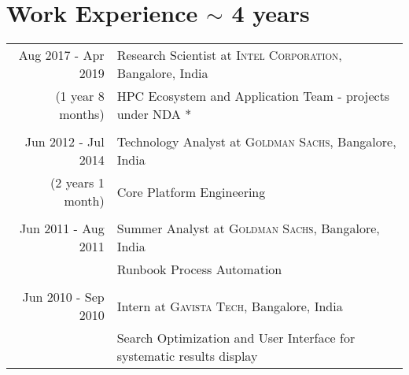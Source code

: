 \documentclass[a4paper,10pt]{article} %
\begin{document}

\section{Work Experience $\sim$ 4 years}

\begin{tabular}{r|p{10cm}}
Aug 2017 - Apr 2019 & Research Scientist at \textsc{Intel Corporation}, Bangalore, India \\
{\footnotesize(1 year 8 months)} & \footnotesize{HPC Ecosystem and Application Team} - projects under NDA *\\
&\\

Jun 2012 - Jul 2014 & Technology Analyst at \textsc{Goldman Sachs}, Bangalore, India \\
{\footnotesize (2 years 1 month)} & \footnotesize{Core Platform Engineering}\\ 
& \\



Jun 2011 - Aug 2011 & Summer Analyst at \textsc{Goldman Sachs}, Bangalore, India \\
& \footnotesize{Runbook Process Automation}\\
& \\


Jun 2010 - Sep 2010 & Intern at \textsc{Gavista Tech}, Bangalore, India\\
& \footnotesize{Search Optimization and User Interface for systematic results display}\\

\end{tabular}


\vspace{-0.1em}
\end{document}
